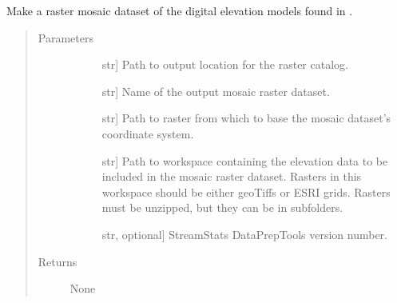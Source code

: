 \documentclass[letterpaper,10pt,english]{sphinxmanual}
\begin{document}
\begin{fulllineitems}
\label{\detokenize{elevationTools:elevationTools.elevIndex}}
Make a raster mosaic dataset of the digital elevation models found in .
\begin{quote}\begin{description}
\item[{Parameters}] \leavevmode\begin{description}
\item[{}] \leavevmode{[}str{]}
Path to output location for the raster catalog.

\item[{}] \leavevmode{[}str{]}
Name of the output mosaic raster dataset.

\item[{}] \leavevmode{[}str{]}
Path to raster from which to base the mosaic dataset’s coordinate system.

\item[{}] \leavevmode{[}str{]}
Path to workspace containing the elevation data to be included in the mosaic raster dataset. Rasters in this workspace should be either geoTiffs or ESRI grids. Rasters must be unzipped, but they can be in subfolders.

\item[{}] \leavevmode{[}str, optional{]}
StreamStats DataPrepTools version number.

\end{description}

\item[{Returns}] \leavevmode\begin{description}
\item[{None}] \leavevmode
\end{description}

\end{description}\end{quote}

\end{fulllineitems}

\end{document}
